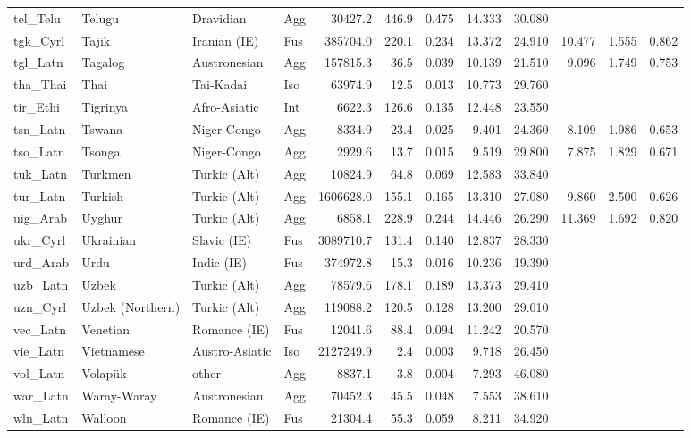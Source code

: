 \begin{tabular}{ll l l rr rr r rr r}
tel\_Telu & Telugu & Dravidian & Agg & 30427.2 & 446.9 & 0.475 & 14.333 & 30.080 &  &  &  \\
tgk\_Cyrl & Tajik & Iranian (IE) & Fus & 385704.0 & 220.1 & 0.234 & 13.372 & 24.910 & 10.477 & 1.555 & 0.862 \\
tgl\_Latn & Tagalog & Austronesian & Agg & 157815.3 & 36.5 & 0.039 & 10.139 & 21.510 & 9.096 & 1.749 & 0.753 \\
tha\_Thai & Thai & Tai-Kadai & Iso & 63974.9 & 12.5 & 0.013 & 10.773 & 29.760 &  &  &  \\
tir\_Ethi & Tigrinya & Afro-Asiatic & Int & 6622.3 & 126.6 & 0.135 & 12.448 & 23.550 &  &  &  \\
tsn\_Latn & Tswana & Niger-Congo & Agg & 8334.9 & 23.4 & 0.025 & 9.401 & 24.360 & 8.109 & 1.986 & 0.653 \\
tso\_Latn & Tsonga & Niger-Congo & Agg & 2929.6 & 13.7 & 0.015 & 9.519 & 29.800 & 7.875 & 1.829 & 0.671 \\
tuk\_Latn & Turkmen & Turkic (Alt) & Agg & 10824.9 & 64.8 & 0.069 & 12.583 & 33.840 &  &  &  \\
tur\_Latn & Turkish & Turkic (Alt) & Agg & 1606628.0 & 155.1 & 0.165 & 13.310 & 27.080 & 9.860 & 2.500 & 0.626 \\
uig\_Arab & Uyghur & Turkic (Alt) & Agg & 6858.1 & 228.9 & 0.244 & 14.446 & 26.290 & 11.369 & 1.692 & 0.820 \\
ukr\_Cyrl & Ukrainian & Slavic (IE) & Fus & 3089710.7 & 131.4 & 0.140 & 12.837 & 28.330 &  &  &  \\
urd\_Arab & Urdu & Indic (IE) & Fus & 374972.8 & 15.3 & 0.016 & 10.236 & 19.390 &  &  &  \\
uzb\_Latn & Uzbek & Turkic (Alt) & Agg & 78579.6 & 178.1 & 0.189 & 13.373 & 29.410 &  &  &  \\
uzn\_Cyrl & Uzbek (Northern) & Turkic (Alt) & Agg & 119088.2 & 120.5 & 0.128 & 13.200 & 29.010 &  &  &  \\
vec\_Latn & Venetian & Romance (IE) & Fus & 12041.6 & 88.4 & 0.094 & 11.242 & 20.570 &  &  &  \\
vie\_Latn & Vietnamese & Austro-Asiatic & Iso & 2127249.9 & 2.4 & 0.003 & 9.718 & 26.450 &  &  &  \\
vol\_Latn & Volapük & other & Agg & 8837.1 & 3.8 & 0.004 & 7.293 & 46.080 &  &  &  \\
war\_Latn & Waray-Waray & Austronesian & Agg & 70452.3 & 45.5 & 0.048 & 7.553 & 38.610 &  &  &  \\
wln\_Latn & Walloon & Romance (IE) & Fus & 21304.4 & 55.3 & 0.059 & 8.211 & 34.920 &  &  &  \\

\end{tabular}
